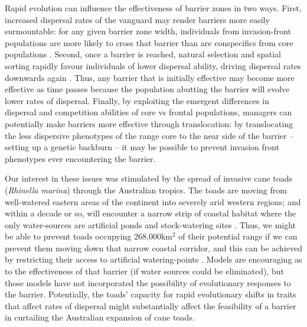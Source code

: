 \documentclass{article}
\begin{document}
Rapid evolution can influence the effectiveness of barrier zones in two ways. First, increased dispersal rates of the vanguard may render barriers more easily surmountable: for any given barrier zone width, individuals from invasion-front populations are more likely to cross that barrier than are conspecifics from core populations \citep{Travis_Smith_Ranwala_2010}. Second, once a barrier is reached, natural selection and spatial sorting rapidly favour individuals of lower dispersal ability, driving dispersal rates downwards again \citep{Kubisch_Hovestadt_Poethke_2010, Phillips_2012}.  Thus, any barrier that is initially effective may become more effective as time passes because the population abutting the barrier will evolve lower rates of dispersal.  Finally, by exploiting the emergent differences in dispersal and competition abilities of core vs frontal populations, managers can potentially make barriers more effective through translocation: by translocating the less dispersive phenotypes of the range core to the near side of the barrier -- setting up a genetic backburn -- it may be possible to prevent invasion front phenotypes ever encountering the barrier. 

Our interest in these issues was stimulated by the spread of invasive cane toads (\emph{Rhinella marina}) through the Australian tropics. The toads are moving from well-watered eastern areas of the continent into severely arid western regions; and within a decade or so, will encounter a narrow strip of coastal habitat where the only water-sources are artificial ponds and stock-watering sites \citep{Florance_Webb_Dempster_Kearney_Worthing_Letnic_2011, Tingley_Phillips_Letnic_Brown_Shine_Baird_2013}. Thus, we might be able to prevent toads occupying 268,000km$^2$ of their potential range if we can prevent them moving down that narrow coastal corridor, and this can be achieved by restricting their access to artificial watering-points \citep{Tingley_Phillips_Letnic_Brown_Shine_Baird_2013, Letnic_Webb_Jessop_Florance_Dempster_2014}. Models are encouraging as to the effectiveness of that barrier (if water sources could be eliminated), but those models have not incorporated the possibility of evolutionary responses to the barrier. Potentially, the toads' capacity for rapid evolutionary shifts in traits that affect rates of dispersal \citep{Phillips_Brown_Shine_2010, Brown_2014} might substantially affect the feasibility of a barrier in curtailing the Australian expansion of cane toads.
\end{document}
